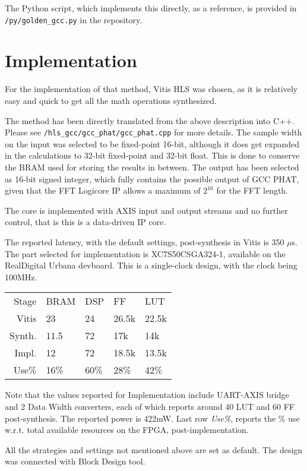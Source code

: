 \documentclass[a4paper,twocolumn]{article}
\begin{document}
The Python script, which implements this directly, as a reference, is
provided in \texttt{/py/golden\_gcc.py} in the repository.

\section{Implementation}

For the implementation of that method, Vitis HLS was chosen, as it is
relatively easy and quick to get all the math operations synthesized.

The method has been directly translated from the above description
into C++. Please see \texttt{/hls\_gcc/gcc\_phat/gcc\_phat.cpp} for
more details. The sample width on the input was selected to be
fixed-point 16-bit, although it does get expanded in the calculations
to 32-bit fixed-point and 32-bit float. This is done to conserve the
BRAM used for storing the results in between. The output has been
selected as 16-bit signed integer, which fully contains the possible
output of GCC PHAT, given that the FFT Logicore IP\cite{xfft} allows a
maximum of $2^{16}$ for the FFT length.

The core is implemented with AXIS input and output streams and no
further control, that is this is a data-driven IP core. 

The reported latency, with the default settings, post-synthesis
in Vitis is 350 $\mu$s. The part selected for implementation is
XC7S50CSGA324-1, available on the RealDigital Urbana devboard.
This is a single-clock design, with the clock being 100MHz.

\begin{tabular}{r|l|l|l|l}
  Stage & BRAM & DSP & FF & LUT \\
  Vitis & 23 & 24 & 26.5k & 22.5k \\
  Synth. & 11.5 & 72 & 17k & 14k \\
  Impl. & 12 & 72 & 18.5k & 13.5k \\
  Use\% & 16\% & 60\% & 28\% & 42\%
\end{tabular}

Note that the values reported for Implementation include UART-AXIS
bridge and 2 Data Width converters, each of which reports around 40
LUT and 60 FF post-synthesis. The reported power is 422mW. Last row
\emph{Use\%}, reports the \% use w.r.t. total available resources on
the FPGA, post-implementation.

All the strategies and settings not mentioned above are set as
default. The design was connected with Block Design tool.
\end{document}
